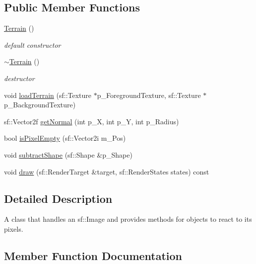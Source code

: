 \subsection*{Public Member Functions}
\begin{DoxyCompactItemize}
\item 
\mbox{\label{class_terrain_a7160a06ab07a86ed97d23374405e8ef6}} 
\hyperlink{class_terrain_a7160a06ab07a86ed97d23374405e8ef6}{Terrain} ()
\begin{DoxyCompactList}\small\item\em default constructor \end{DoxyCompactList}\item 
\mbox{\label{class_terrain_a2f7f0a2aee54886324ccf48a6f321de0}} 
\hyperlink{class_terrain_a2f7f0a2aee54886324ccf48a6f321de0}{$\sim$\+Terrain} ()
\begin{DoxyCompactList}\small\item\em destructor \end{DoxyCompactList}\item 
void \hyperlink{class_terrain_aed679808f60645f640f51ccfcba060ea}{load\+Terrain} (sf\+::\+Texture $\ast$p\+\_\+\+Foreground\+Texture, sf\+::\+Texture $\ast$p\+\_\+\+Background\+Texture)
\item 
sf\+::\+Vector2f \hyperlink{class_terrain_aeb669403f8c3ed5bd4db2ff68f7f3ee2}{get\+Normal} (int p\+\_\+X, int p\+\_\+Y, int p\+\_\+\+Radius)
\item 
bool \hyperlink{class_terrain_a163e210cde25acd11b12a0a68e6f2c66}{is\+Pixel\+Empty} (sf\+::\+Vector2i m\+\_\+\+Pos)
\item 
void \hyperlink{class_terrain_a57c6fe83cb58a979f73405068cf3b435}{subtract\+Shape} (sf\+::\+Shape \&p\+\_\+\+Shape)
\item 
void \hyperlink{class_terrain_a46d26ac3525b10ca6bbf065b2627c2b6}{draw} (sf\+::\+Render\+Target \&target, sf\+::\+Render\+States states) const
\end{DoxyCompactItemize}


\subsection{Detailed Description}
A class that handles an sf\+::\+Image and provides methods for objects to react to its pixels. 

\subsection{Member Function Documentation}
\mbox{\label{class_terrain_a46d26ac3525b10ca6bbf065b2627c2b6}} 
